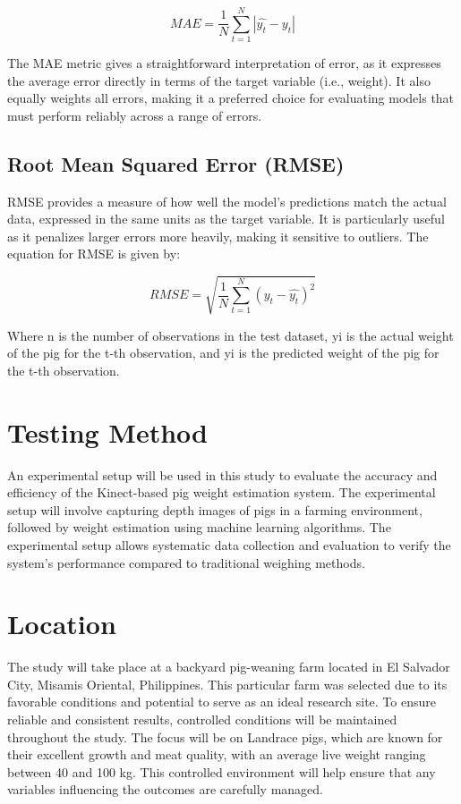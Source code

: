 {\begin{equation}
	MAE = \frac{1}{N} \sum_{t=1}^{N} \left| \hat{y_t} - y_t \right|
\end{equation}

The MAE metric gives a straightforward interpretation of error, as it expresses the average error directly in terms of the target variable (i.e., weight). It also equally weights all errors, making it a preferred choice for evaluating models that must perform reliably across a range of errors.

\subsection{Root Mean Squared Error (RMSE)}
RMSE provides a measure of how well the model's predictions match the actual data, expressed in the same units as the target variable. It is particularly useful as it penalizes larger errors more heavily, making it sensitive to outliers. The equation for RMSE is given by:

\begin{equation}
	RMSE = \sqrt{\frac{1}{N} \sum_{t=1}^{N} \left( y_t - \hat{y_t} \right)^2}
\end{equation}

Where n is the number of observations in the test dataset, yi is the actual weight of the pig for the t-th observation, and yi is the predicted weight of the pig for the t-th observation.

\section{Testing Method}
An experimental setup will be used in this study to evaluate the accuracy and efficiency of the Kinect-based pig weight estimation system. The experimental setup will involve capturing depth images of pigs in a farming environment, followed by weight estimation using machine learning algorithms. The experimental setup allows systematic data collection and evaluation to verify the system’s performance compared to traditional weighing methods.

\section{Location}
The study will take place at a backyard pig-weaning farm located in El Salvador City, Misamis Oriental, Philippines. This particular farm was selected due to its favorable conditions and potential to serve as an ideal research site. To ensure reliable and consistent results, controlled conditions will be maintained throughout the study. The focus will be on Landrace pigs, which are known for their excellent growth and meat quality, with an average live weight ranging between 40 and 100 kg. This controlled environment will help ensure that any variables influencing the outcomes are carefully managed.

}
